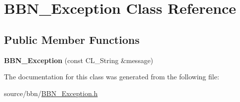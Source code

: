 \hypertarget{classBBN__Exception}{
\section{BBN\_\-Exception Class Reference}
\label{classBBN__Exception}
}
\subsection*{Public Member Functions}
\begin{DoxyCompactItemize}
\item 
\hypertarget{classBBN__Exception_a30c345cef555810edd44ab2b41fd5d9e}{
{\bfseries BBN\_\-Exception} (const CL\_\-String \&message)}
\label{classBBN__Exception_a30c345cef555810edd44ab2b41fd5d9e}

\end{DoxyCompactItemize}


The documentation for this class was generated from the following file:\begin{DoxyCompactItemize}
\item 
source/bbn/\hyperlink{BBN__Exception_8h}{BBN\_\-Exception.h}\end{DoxyCompactItemize}
